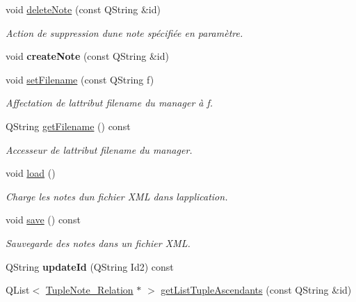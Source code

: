 \begin{DoxyCompactItemize}
void \hyperlink{class_notes_manager_a989429244c36c35ef68204f6ae2a0a5f}{delete\+Note} (const Q\+String \&id)
\begin{DoxyCompactList}\small\item\em Action de suppression d\textquotesingle{}une note spécifiée en paramètre. \end{DoxyCompactList}\item 
\mbox{\label{class_notes_manager_a5a47d17ce4add155db4715f027a7ea4f}} 
void {\bfseries create\+Note} (const Q\+String \&id)
\item 
void \hyperlink{class_notes_manager_a797d858176de3f5e64aa8194797909fb}{set\+Filename} (const Q\+String f)
\begin{DoxyCompactList}\small\item\em Affectation de l\textquotesingle{}attribut filename du manager à f. \end{DoxyCompactList}\item 
Q\+String \hyperlink{class_notes_manager_a566cbb0dd7b606ec34629a2aa8010b73}{get\+Filename} () const
\begin{DoxyCompactList}\small\item\em Accesseur de l\textquotesingle{}attribut filename du manager. \end{DoxyCompactList}\item 
void \hyperlink{class_notes_manager_ad4fb2de50633dd25b71024343341cd64}{load} ()
\begin{DoxyCompactList}\small\item\em Charge les notes d\textquotesingle{}un fichier X\+ML dans l\textquotesingle{}application. \end{DoxyCompactList}\item 
void \hyperlink{class_notes_manager_ad271bd7f8079b01b04a32b886b498bac}{save} () const
\begin{DoxyCompactList}\small\item\em Sauvegarde des notes dans un fichier X\+ML. \end{DoxyCompactList}\item 
\mbox{\label{class_notes_manager_a2a8aba4f2f40239fce1b541a10b92a7e}} 
Q\+String {\bfseries update\+Id} (Q\+String Id2) const
\item 
Q\+List$<$ \hyperlink{class_tuple_note___relation}{Tuple\+Note\+\_\+\+Relation} $\ast$ $>$ \hyperlink{class_notes_manager_a9f2c72d67d67c89a61f77a9b1a0ae390}{get\+List\+Tuple\+Ascendants} (const Q\+String \&id)

\end{DoxyCompactItemize}
